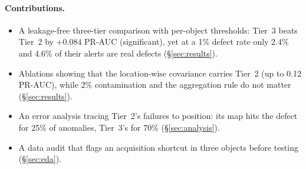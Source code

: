 \paragraph{Contributions.}
\begin{itemize}
  \item A leakage-free three-tier comparison with per-object thresholds: Tier~3 beats Tier~2 by
    $+0.084$ PR-AUC (significant), yet at a 1\% defect rate only 2.4\% and 4.6\% of their alerts are
    real defects (\S\ref{sec:results}).
  \item Ablations showing that the location-wise covariance carries Tier~2 (up to 0.12 PR-AUC), while
    2\% contamination and the aggregation rule do not matter (\S\ref{sec:results}).
  \item An error analysis tracing Tier~2's failures to position: its map hits the defect for 25\% of
    anomalies, Tier~3's for 70\% (\S\ref{sec:analysis}).
  \item A data audit that flags an acquisition shortcut in three objects before testing
    (\S\ref{sec:eda}).
\end{itemize}
